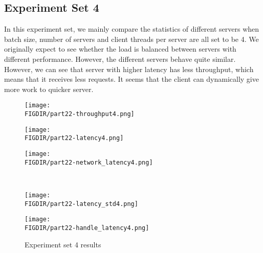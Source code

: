 \documentclass{article}
\begin{document}
\begin{spacing}{1.1}
\subsection{Experiment Set 4}
In this experiment set, we mainly compare the statistics of different servers when batch size, number of servers and client threads per server are all set to be 4. We originally expect to see whether the load is balanced between servers with different performance. However, the different servers behave quite similar. However, we can see that server with higher latency has less throughput, which means that it receives less requests. It seems that the client can dynamically give more work to quicker server.
\begin{figure}[htbp]
    \centering
    \begin{minipage}{0.32\linewidth}
        \centering
	\texttt{[image: \\FIGDIR/part22-throughput4.png]}
	\label{throuput4}
    \end{minipage}
    \begin{minipage}{0.32\linewidth}
        \centering
        \texttt{[image: \\FIGDIR/part22-latency4.png]}
        \label{latency4}
    \end{minipage}
    \begin{minipage}{0.32\linewidth}
        \centering
        \texttt{[image: \\FIGDIR/part22-network\_latency4.png]}
        \label{network-latency4}
    \end{minipage} \\
    \begin{minipage}{0.32\linewidth}
        \centering
        \texttt{[image: \\FIGDIR/part22-latency\_std4.png]}
        \label{latency-std4}
    \end{minipage}
    \begin{minipage}{0.32\linewidth}
        \centering
        \texttt{[image: \\FIGDIR/part22-handle\_latency4.png]}
        \label{handle-latency4}
    \end{minipage}
    \caption{Experiment set 4 results}
\end{figure}

\end{spacing}
\end{document}
